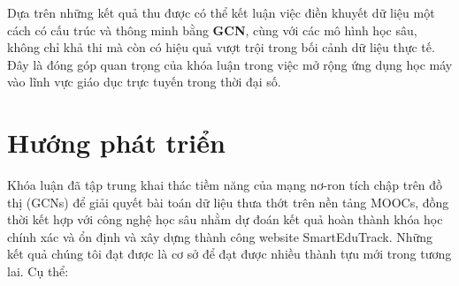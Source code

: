 Dựa trên những kết quả thu được có thể kết luận việc điền khuyết dữ liệu một cách có cấu trúc và thông minh bằng \textbf{GCN}, cùng với các mô hình học sâu, không chỉ khả thi mà còn có hiệu quả vượt trội trong bối cảnh dữ liệu thực tế. Đây là đóng góp quan trọng của khóa luận trong việc mở rộng ứng dụng học máy vào lĩnh vực giáo dục trực tuyến trong thời đại số.

\section{Hướng phát triển}

Khóa luận đã tập trung khai thác tiềm năng của mạng nơ-ron tích chập trên đồ thị (GCNs) để giải quyết bài toán dữ liệu thưa thớt trên nền tảng MOOCs, đồng thời kết hợp với  công nghệ học sâu nhằm dự đoán kết quả hoàn thành khóa học chính xác và ổn định và xây dựng thành công website SmartEduTrack. Những kết quả chúng tôi đạt được là cơ sở để đạt được nhiều thành tựu mới trong tương lai. Cụ thể:

